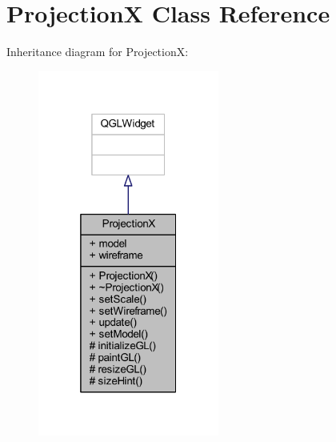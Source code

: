 \hypertarget{class_projection_x}{}\section{ProjectionX Class Reference}
\label{class_projection_x}


Inheritance diagram for ProjectionX\+:
\nopagebreak
\begin{figure}[H]
\begin{center}
\leavevmode
\includegraphics[width=169pt]{class_projection_x__inherit__graph}
\end{center}
\end{figure}


